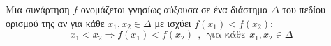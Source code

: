 Μια συνάρτηση $ f $  ονομάζεται γνησίως αύξουσα σε ένα διάστημα $\Delta $ του πεδίου ορισμού της αν για κάθε $ x_1,x_2\in\Delta $ με ισχύει $ f(x_1)<f(x_2) $:
\[ x_1<x_2\Rightarrow f(x_1)<f(x_2)\ \ ,\ \ \textrm{για κάθε }x_1,x_2\in\mathbb{\varDelta} \]
